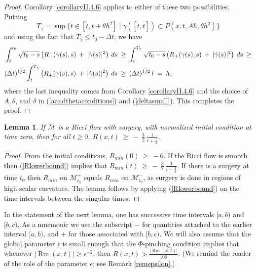 \documentclass[12pt]{amsart}
\newcommand{\De}{\Delta}
\newcommand{\La}{\Lambda}
\newcommand{\M}{{\mathcal M}}
\newcommand{\Rm}{\operatorname{Rm}}
\renewcommand{\th}{\theta}
\newcommand{\de}{\delta}
\newcommand{\eps}{\epsilon}
\newcommand{\ga}{\gamma}
\numberwithin{equation}{section}
\theoremstyle{plain}
\newtheorem{lemma}[equation]{Lemma}
\theoremstyle{definition}
\theoremstyle{remark}
\begin{document}
\begin{proof}
Corollary \ref{corollaryII.4.6} applies to either of these
two possibilities. Putting
\begin{equation}
T_\ga= \sup\{\bar t\in [t,t+\theta h^2]\mid \ga([t,\bar t])\subset
P(x,t,Ah,\theta h^2)\}
\end{equation}
and using the fact that $T_\ga \le t_0 - \De t$,
we have
\begin{align}
& \int_{t}^{t_0} \sqrt{t_0 - s} \left( R_+(\gamma(s), s) \: + \:
|\dot{\gamma}(s)|^2 \right) \: ds \: \ge \:
\int_{t}^{T_\gamma} 
\sqrt{t_0 - s} \left( R_+(\gamma(s), s) \: + \:
|\dot{\gamma}(s)|^2 \right) \: ds \: \ge \\
& (\Delta t)^{1/2} \int_{t}^{T_\gamma} 
\left( R_+(\gamma(s), s) \: + \:
|\dot{\gamma}(s)|^2 \right) \: ds \: \ge \:
(\Delta t)^{1/2} \: l \: = \: \La, \notag
\end{align} 
where the last inequality comes from Corollary \ref{corollaryII.4.6} 
and the choice
of $A,\th$, and $\de$ in (\ref{aandthetaconditions}) and (\ref{deltasmall}).
This completes the proof.
\end{proof}

\begin{lemma} \label{Rev}
If $\M$ is a Ricci flow with surgery, with normalized initial
condition at time zero, then for all $t \ge 0$, $R(x,t) \: \ge \:
- \: \frac{3}{2} \: \frac{1}{t+\frac14}$.
\end{lemma}
\begin{proof}
From the initial conditions, $R_{min}(0) \: \ge \: -6$.
If the Ricci flow is smooth then 
(\ref{Rlowerbound}) implies
that $R_{min}(t) \: \ge \: - \: \frac{3}{2} \: \frac{1}{t+\frac14}$.
If there is a surgery
at time $t_0$ then $R_{min}$ on $\M_{t_0}^+$ equals
$R_{min}$ on $\M_{t_0}^-$, as surgery is done in
regions of high scalar curvature.  The lemma follows by applying
(\ref{Rlowerbound}) on the time intervals between
the singular times.
\end{proof}

In the statement of the next lemma, one has successive
time intervals $[a,b)$ and $[b,c)$. As a mnemonic we
use the subscript $-$ for quantities attached to the
earlier interval $[a,b)$, and $+$ for those associated with $[b,c)$.
We will also assume that the global parameter $\epsilon$ is small
enough that the $\Phi$-pinching condition 
implies that whenever $|\Rm(x,t)|\geq \eps^{-2}$, then 
$R(x,t)>\frac{|\Rm(x,t)|}{100}$.
(We  remind the reader of the role of the parameter
$\epsilon$; see Remark \ref{remepsilon}.) 
\end{document}
